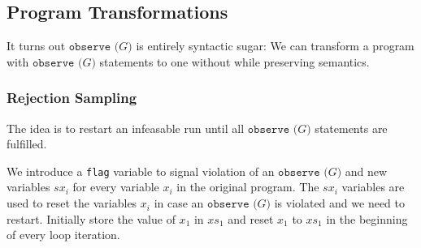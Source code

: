 \documentclass[english]{panikzettel}
\newcommand{\stmtSkip}{\texttt{skip}}
\newcommand{\stmtDiverge}{\texttt{diverge}}
\newcommand{\stmtAsgn}[2]{#1 := #2}
\newcommand{\stmtObserve}[1]{\texttt{observe (}#1\texttt{)}}
\newcommand{\stmtRasgn}[2]{#1 :\approx #2}
\newcommand{\stmtSeq}[2]{#1;~ #2}
\newcommand{\stmtIf}[3]{\texttt{if}~(#1)~\{ #2 \}~\texttt{else}~\{ #3 \}}
\newcommand{\stmtProb}[3]{#2 ~[#1]~ #3}
\newcommand{\stmtWhile}[2]{\texttt{while}~(#1)~\{ #2 \}}
\newcommand{\lfp}{\mathrm{lfp}~}
\newcommand{\lam}[1]{\lambda #1.~}
\newcommand{\cwp}{\mathrm{cwp}}
\newcommand{\rat}{\mathbb{Q}}
\begin{document}

\subsection{Program Transformations}

It turns out $\stmtObserve{G}$ is entirely syntactic sugar: We can transform a program with $\stmtObserve{G}$ statements to one without while preserving semantics.

\subsubsection{Rejection Sampling}

The idea is to restart an infeasable run until all $\stmtObserve{G}$ statements are fulfilled.

We introduce a \texttt{flag} variable to signal violation of an $\stmtObserve{G}$ and new variables $sx_i$ for every variable $x_i$ in the original program.
The $sx_i$ variables are used to reset the variables $x_i$ in case an $\stmtObserve{G}$ is violated and we need to restart.
Initially store the value of $x_1$ in $xs_1$ and reset $x_1$ to $xs_1$ in the beginning of every loop iteration.
\end{document}
